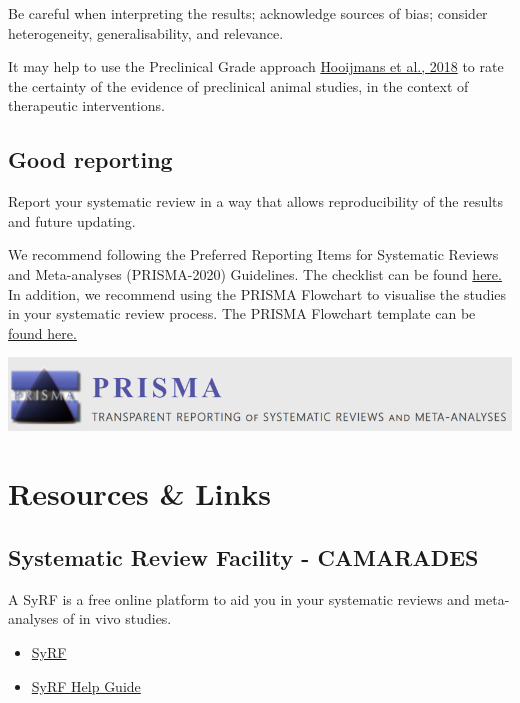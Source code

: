 \documentclass[
]{book}
\providecommand{\tightlist}{%
  \setlength{\itemsep}{0pt}\setlength{\parskip}{0pt}}
\begin{document}
Be careful when interpreting the results; acknowledge sources of bias; consider heterogeneity, generalisability, and relevance.

It may help to use the Preclinical Grade approach \href{https://journals.plos.org/plosone/article?id=10.1371/journal.pone.0187271}{Hooijmans et al., 2018} to rate the certainty of the evidence of preclinical animal studies, in the context of therapeutic interventions.

\section{Good reporting}\label{good-reporting}

Report your systematic review in a way that allows reproducibility of the results and future updating.

We recommend following the Preferred Reporting Items for Systematic Reviews and Meta-analyses (PRISMA-2020) Guidelines. The checklist can be found \href{https://www.prisma-statement.org/prisma-2020-checklist}{here.} In addition, we recommend using the PRISMA Flowchart to visualise the studies in your systematic review process. The PRISMA Flowchart template can be \href{https://www.prisma-statement.org/prisma-2020-flow-diagram}{found here.}

\includegraphics{figs/PRISMA.png}

\chapter{Resources \& Links}\label{resources-links}

\section{Systematic Review Facility - CAMARADES}\label{systematic-review-facility---camarades}

A SyRF is a free online platform to aid you in your systematic reviews and meta-analyses of in vivo studies.

\begin{itemize}
\tightlist
\item
  \href{https://syrf.org.uk/}{SyRF}
\item
  \href{https://help.syrf.org.uk/}{SyRF Help Guide}
\end{itemize}
\end{document}
